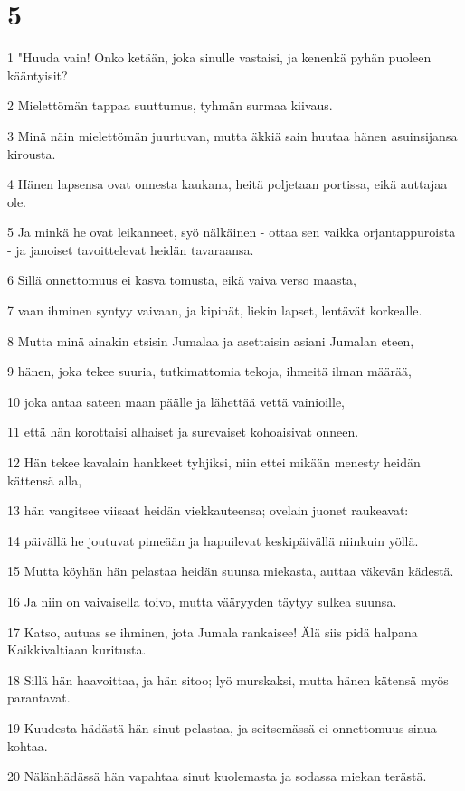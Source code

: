 \chapter{5}

\par 1 "Huuda vain! Onko ketään, joka sinulle vastaisi, ja kenenkä pyhän puoleen kääntyisit?
\par 2 Mielettömän tappaa suuttumus, tyhmän surmaa kiivaus.
\par 3 Minä näin mielettömän juurtuvan, mutta äkkiä sain huutaa hänen asuinsijansa kirousta.
\par 4 Hänen lapsensa ovat onnesta kaukana, heitä poljetaan portissa, eikä auttajaa ole.
\par 5 Ja minkä he ovat leikanneet, syö nälkäinen - ottaa sen vaikka orjantappuroista - ja janoiset tavoittelevat heidän tavaraansa.
\par 6 Sillä onnettomuus ei kasva tomusta, eikä vaiva verso maasta,
\par 7 vaan ihminen syntyy vaivaan, ja kipinät, liekin lapset, lentävät korkealle.
\par 8 Mutta minä ainakin etsisin Jumalaa ja asettaisin asiani Jumalan eteen,
\par 9 hänen, joka tekee suuria, tutkimattomia tekoja, ihmeitä ilman määrää,
\par 10 joka antaa sateen maan päälle ja lähettää vettä vainioille,
\par 11 että hän korottaisi alhaiset ja surevaiset kohoaisivat onneen.
\par 12 Hän tekee kavalain hankkeet tyhjiksi, niin ettei mikään menesty heidän kättensä alla,
\par 13 hän vangitsee viisaat heidän viekkauteensa; ovelain juonet raukeavat:
\par 14 päivällä he joutuvat pimeään ja hapuilevat keskipäivällä niinkuin yöllä.
\par 15 Mutta köyhän hän pelastaa heidän suunsa miekasta, auttaa väkevän kädestä.
\par 16 Ja niin on vaivaisella toivo, mutta vääryyden täytyy sulkea suunsa.
\par 17 Katso, autuas se ihminen, jota Jumala rankaisee! Älä siis pidä halpana Kaikkivaltiaan kuritusta.
\par 18 Sillä hän haavoittaa, ja hän sitoo; lyö murskaksi, mutta hänen kätensä myös parantavat.
\par 19 Kuudesta hädästä hän sinut pelastaa, ja seitsemässä ei onnettomuus sinua kohtaa.
\par 20 Nälänhädässä hän vapahtaa sinut kuolemasta ja sodassa miekan terästä.
